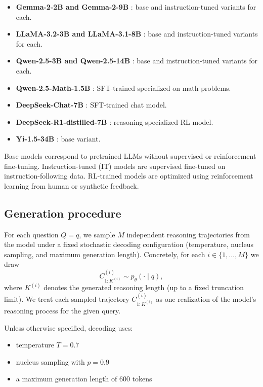 \documentclass{article}
\begin{document}
\begin{itemize}
\item \textbf{Gemma-2-2B and Gemma-2-9B} \cite{gemmateam2024gemma2improvingopen}: base and instruction-tuned variants for each.
\item \textbf{LLaMA-3.2-3B and LLaMA-3.1-8B} \cite{grattafiori2024llama3herdmodels}: base and instruction-tuned variants for each.
\item \textbf{Qwen-2.5-3B and Qwen-2.5-14B} \cite{qwen2025qwen25technicalreport}: base and instruction-tuned variants for each.
\item \textbf{Qwen-2.5-Math-1.5B} \cite{qwen2025qwen25technicalreport}: SFT-trained specialized on math problems.
\item \textbf{DeepSeek-Chat-7B} \cite{deepseekai2024deepseekllmscalingopensource}: SFT-trained chat model.
\item \textbf{DeepSeek-R1-distilled-7B} \cite{Guo_2025}: reasoning-specialized RL model.
\item \textbf{Yi-1.5-34B} \cite{ai2025yiopenfoundationmodels}: base variant.
\end{itemize}

Base models correspond to pretrained LLMs without supervised or reinforcement fine-tuning. Instruction-tuned (IT) models are supervised fine-tuned on instruction-following data. RL-trained models are optimized using reinforcement learning from human or synthetic feedback.

\subsection{Generation procedure}
\label{subsec:generation_procedure}

For each question \(Q=q\), we sample \(M\) independent reasoning trajectories from the model under a fixed stochastic decoding configuration (temperature, nucleus sampling, and maximum generation length). Concretely, for each \(i \in \{1,\dots,M\}\) we draw
\[
C^{(i)}_{1:K^{(i)}} \sim p_\theta(\cdot \mid q),
\]
where \(K^{(i)}\) denotes the generated reasoning length (up to a fixed truncation limit). We treat each sampled trajectory \(C^{(i)}_{1:K^{(i)}}\) as one realization of the model's reasoning process for the given query.

Unless otherwise specified, decoding uses:
\begin{itemize}
    \item temperature $T=0.7$
    \item nucleus sampling with $p=0.9$
    \item a maximum generation length of 600 tokens
\end{itemize}
\end{document}
